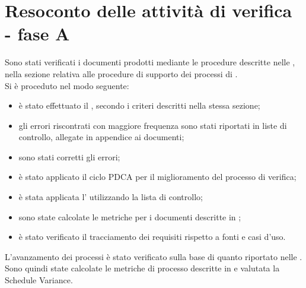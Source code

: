 \section{Resoconto delle attività di verifica - fase A}
Sono stati verificati i documenti prodotti mediante le procedure descritte nelle \NormeDiProgetto{}, nella sezione relativa alle procedure di supporto dei processi di \VV{}.\\
Si è proceduto nel modo seguente:\begin{itemize}
	\item è stato effettuato il , secondo i criteri descritti nella stessa sezione;
	\item gli errori riscontrati con maggiore frequenza sono stati riportati in liste di controllo, allegate in appendice ai documenti;
	\item sono stati corretti gli errori;
	\item è stato applicato il ciclo PDCA per il miglioramento del processo di verifica;
	\item è stata applicata l' utilizzando la lista di controllo;
	\item sono state calcolate le metriche per i documenti descritte in ;
	\item è stato verificato il tracciamento dei requisiti rispetto a fonti e casi d'uso.
\end{itemize}
L'avanzamento dei processi è stato verificato sulla base di quanto riportato nelle \NormeDiProgetto{}. Sono quindi state calcolate le metriche di processo descritte in  e valutata la Schedule Variance.
